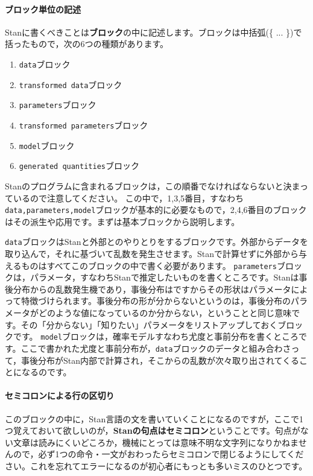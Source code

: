 \documentclass{ltjsbook}
\begin{document}
\paragraph{ブロック単位の記述}
Stanに書くべきことは\textbf{ブロック}の中に記述します。ブロックは中括弧(\{ ... \})で括ったもので，次の6つの種類があります。
\begin{enumerate}
	\item \texttt{data}ブロック
	\item \texttt{transformed data}ブロック
	\item \texttt{parameters}ブロック
	\item \texttt{transformed parameters}ブロック
	\item \texttt{model}ブロック
	\item \texttt{generated quantities}ブロック
\end{enumerate}

Stanのプログラムに含まれるブロックは，この順番でなければならないと決まっているので注意してください。
この中で，1,3,5番目，すなわち\texttt{data,parameters,model}ブロックが基本的に必要なもので，2,4,6番目のブロックはその派生や応用です。まずは基本ブロックから説明します。

\texttt{data}ブロックはStanと外部とのやりとりをするブロックです。外部からデータを取り込んで，それに基づいて乱数を発生させます。Stanで計算せずに外部から与えるものはすべてこのブロックの中で書く必要があります。
\texttt{parameters}ブロックは，パラメータ，すなわちStanで推定したいものを書くところです。Stanは事後分布からの乱数発生機であり，事後分布はですからその形状はパラメータによって特徴づけられます。事後分布の形が分からないというのは，事後分布のパラメータがどのような値になっているのか分からない，ということと同じ意味です。その「分からない」「知りたい」パラメータをリストアップしておくブロックです。
\texttt{model}ブロックは，確率モデルすなわち尤度と事前分布を書くところです。ここで書かれた尤度と事前分布が，\texttt{data}ブロックのデータと組み合わさって，事後分布がStan内部で計算され，そこからの乱数が次々取り出されてくることになるのです。

\paragraph{セミコロンによる行の区切り}
このブロックの中に，Stan言語の文を書いていくことになるのですが，ここで1つ覚えておいて欲しいのが，\textbf{Stanの句点はセミコロン}ということです。句点がない文章は読みにくいどころか，機械にとっては意味不明な文字列になりかねませんので，必ず1つの命令・一文がおわったらセミコロンで閉じるようにしてください。これを忘れてエラーになるのが初心者にもっとも多いミスのひとつです。
\end{document}
